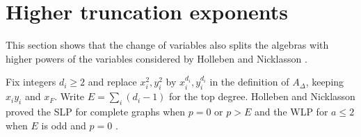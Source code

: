 \documentclass[11pt,a4paper]{article}
\theoremstyle{definition}
\begin{document}
\section{Higher truncation exponents}\label{sec:higher}

This section shows that the change of variables also splits the algebras with higher powers of the variables considered by Holleben and Nicklasson \cite[Section~3]{HN}.

Fix integers $d_i\ge2$ and replace $x_i^2,y_i^2$ by $x_i^{d_i},y_i^{d_i}$ in the definition of $A_\Delta$, keeping $x_iy_i$ and $x_F$. Write $E=\sum_i(d_i-1)$ for the top degree. Holleben and Nicklasson proved the SLP for complete graphs when $p=0$ or $p>E$ \cite[Proposition~3.2]{HN} and the WLP for $a\le2$ when $E$ is odd and $p=0$ \cite[Proposition~3.5]{HN}.
\end{document}
